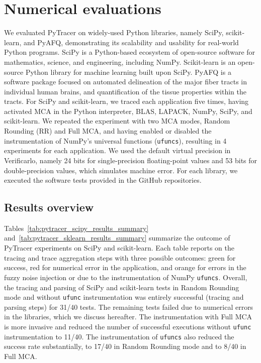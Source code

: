 \documentclass[11pt]{article}
\newcommand{\pytracer}[0]{PyTracer\xspace}
\begin{document}
\section{Numerical evaluations}

We evaluated \pytracer on widely-used Python libraries, namely SciPy, scikit-learn, and PyAFQ, demonstrating its scalability and usability for real-world Python programs. 
SciPy is a Python-based ecosystem of open-source software for mathematics, science, and engineering, including NumPy.
Scikit-learn is an open-source Python library for machine learning built upon SciPy.
PyAFQ is a software package focused on automated delineation of the major fiber tracts in individual human brains, and quantification of the tissue properties within the tracts.
For SciPy and scikit-learn, we traced each application five times, having activated MCA in the Python interpreter, BLAS, LAPACK, NumPy, SciPy, and scikit-learn. We repeated the experiment with two MCA modes, Random Rounding (RR) and Full MCA, and having enabled or disabled the instrumentation of NumPy's universal functions (\texttt{ufuncs}), resulting in 4 experiments for each application. We used the default virtual precision in Verificarlo, namely 24 bits for single-precision floating-point values and 53 bits for double-precision values, which simulates machine error. For each library, we executed the software tests provided in the GitHub repositories.

\subsection{Results overview}

Tables~\ref{tab:pytracer_scipy_results_summary} and~\ref{tab:pytracer_sklearn_results_summary} summarize 
the outcome of \pytracer experiments on SciPy and scikit-learn.
Each table reports on the tracing and trace aggregation steps with three possible outcomes: green for success, red for numerical error in the application, and orange for errors in the fuzzy noise injection or due to the instrumentation of NumPy \texttt{ufuncs}. Overall, the tracing and parsing of SciPy and scikit-learn tests in Random Rounding mode and without \texttt{ufunc} instrumentation was entirely successful (tracing and parsing steps) for 31/40 tests. The remaining tests failed due to numerical errors in the libraries, which we discuss hereafter. The instrumentation with Full MCA is more invasive and reduced the number of successful executions without \texttt{ufunc} instrumentation to 11/40.  The instrumentation of \texttt{ufuncs} also reduced the success rate substantially, to 17/40 in Random Rounding mode and to 8/40 in Full MCA. 
\end{document}
